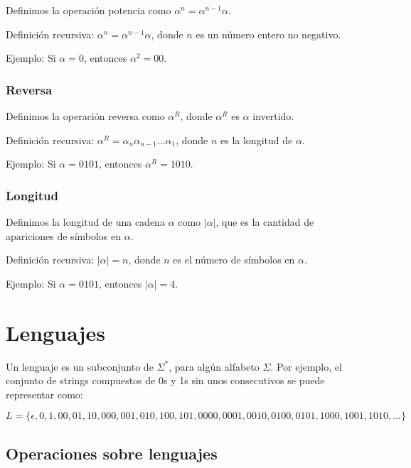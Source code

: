 \documentclass[11pt]{article}
\begin{document}
    Definimos la operación potencia como $\alpha^n = \alpha^{n-1} \alpha$.

    Definición recursiva: $\alpha^n = \alpha^{n-1} \alpha$, donde $n$ es un número entero no negativo.

    Ejemplo: Si $\alpha = 0$, entonces $\alpha^2 = 00$.

    \bigskip %

    \subsubsection{Reversa}

    Definimos la operación reversa como $\alpha^R$, donde $\alpha^R$ es $\alpha$ invertido.

    Definición recursiva: $\alpha^R = \alpha_{n} \alpha_{n-1} \ldots \alpha_{1}$, donde $n$ es la longitud de $\alpha$.

    Ejemplo: Si $\alpha = 0101$, entonces $\alpha^R = 1010$.

    \bigskip %

    \subsubsection{Longitud}

    Definimos la longitud de una cadena $\alpha$ como $|\alpha|$, que es la cantidad de apariciones de símbolos en $\alpha$.

    Definición recursiva: $|\alpha| = n$, donde $n$ es el número de símbolos en $\alpha$.

    Ejemplo: Si $\alpha = 0101$, entonces $|\alpha| = 4$.

    \bigskip %


    \section{Lenguajes}

    Un lenguaje es un subconjunto de $\Sigma^{\ast}$, para algún alfabeto $\Sigma$. Por ejemplo, el conjunto de strings compuestos de 0s y 1s sin unos consecutivos se puede representar como:

    \[ L = \{\epsilon, 0, 1, 00, 01, 10, 000, 001, 010, 100, 101, 0000, 0001, 0010, 0100, 0101, 1000, 1001, 1010, \ldots\} \]

    \bigskip %

    \subsection{Operaciones sobre lenguajes}
\end{document}
